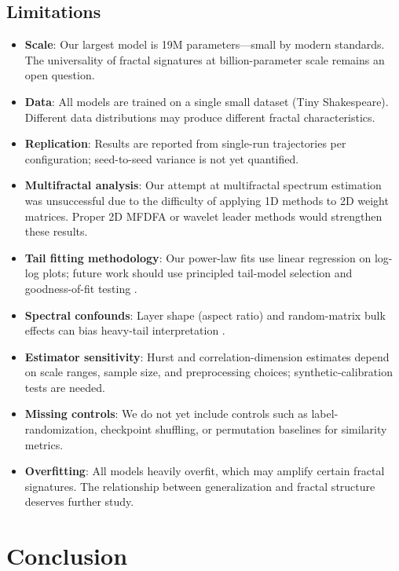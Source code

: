 \documentclass[11pt,a4paper]{article}
\begin{document}
\subsection{Limitations}

\begin{itemize}[leftmargin=*]
    \item \textbf{Scale}: Our largest model is 19M parameters---small by modern standards. The universality of fractal signatures at billion-parameter scale remains an open question.
    \item \textbf{Data}: All models are trained on a single small dataset (Tiny Shakespeare). Different data distributions may produce different fractal characteristics.
    \item \textbf{Replication}: Results are reported from single-run trajectories per configuration; seed-to-seed variance is not yet quantified.
    \item \textbf{Multifractal analysis}: Our attempt at multifractal spectrum estimation was unsuccessful due to the difficulty of applying 1D methods to 2D weight matrices. Proper 2D MFDFA or wavelet leader methods would strengthen these results.
    \item \textbf{Tail fitting methodology}: Our power-law fits use linear regression on log-log plots; future work should use principled tail-model selection and goodness-of-fit testing \citep{clauset2009powerlaw, alstott2014powerlaw}.
    \item \textbf{Spectral confounds}: Layer shape (aspect ratio) and random-matrix bulk effects can bias heavy-tail interpretation \citep{thamm2022randommatrix, staats2023boundary, hu2025eigenspectrum}.
    \item \textbf{Estimator sensitivity}: Hurst and correlation-dimension estimates depend on scale ranges, sample size, and preprocessing choices; synthetic-calibration tests are needed.
    \item \textbf{Missing controls}: We do not yet include controls such as label-randomization, checkpoint shuffling, or permutation baselines for similarity metrics.
    \item \textbf{Overfitting}: All models heavily overfit, which may amplify certain fractal signatures. The relationship between generalization and fractal structure deserves further study.
\end{itemize}

\section{Conclusion}
\end{document}
